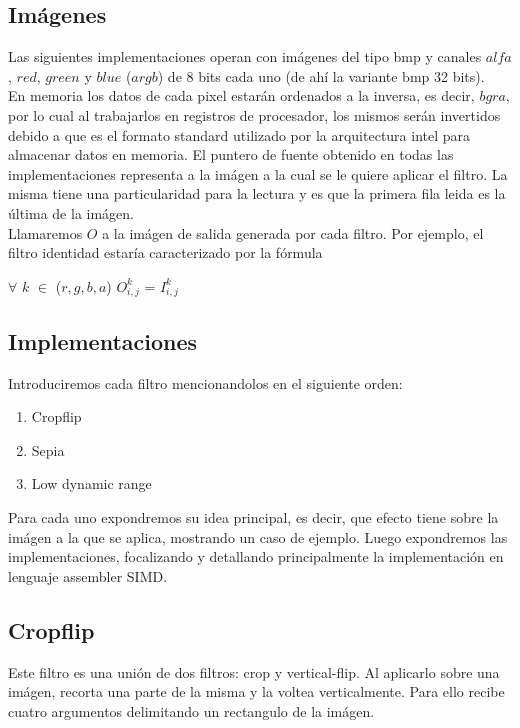 \subsection{Imágenes}

Las siguientes implementaciones operan con imágenes del tipo bmp y canales $alfa$, $red$, $green$ y $blue$ ($argb$) de 8 bits cada uno (de ahí la variante bmp 32 bits).\\

En memoria los datos de cada pixel estarán ordenados a la inversa, es decir, $bgra$, por lo cual al trabajarlos en registros de procesador, los mismos serán invertidos debido a que es el formato standard utilizado por la arquitectura intel para almacenar datos en memoria.
El puntero de fuente obtenido en todas las implementaciones representa a la imágen a la cual se le quiere aplicar el filtro. La misma tiene una particularidad para la lectura y es que la primera fila leida es la última de la imágen.\\

Llamaremos $O$ a la imágen de salida generada por cada filtro. Por ejemplo, el filtro identidad
estaría caracterizado por la fórmula\\

\begin{center}
$\forall$ $k$ $\in$ ($r, g, b, a$) $O^{k}_{i,j}$ = $I^{k}_{i,j}$
\end{center}

\subsection{Implementaciones}
Introduciremos cada filtro mencionandolos en el siguiente orden:
 
\begin{enumerate}
\item Cropflip
\item Sepia
\item Low dynamic range 
\end{enumerate}

Para cada uno expondremos su idea principal, es decir, que efecto tiene sobre la imágen a la que se aplica, mostrando un caso de ejemplo. Luego expondremos las implementaciones, focalizando y detallando principalmente la implementación en lenguaje assembler SIMD.

\subsection{Cropflip}
Este filtro es una unión de dos filtros: crop y vertical-flip. Al aplicarlo sobre una imágen, recorta una parte de la misma y la voltea verticalmente. Para ello recibe cuatro argumentos delimitando un rectangulo de la imágen.

